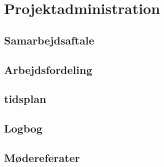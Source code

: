 \chapter{Projektadministration}
 \section{Samarbejdsaftale}
 \section{Arbejdsfordeling}
 \section{tidsplan}
 \section{Logbog}
 \section{Mødereferater}